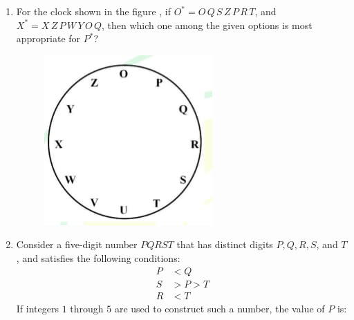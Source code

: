 \documentclass[journal,12pt,onecolumn]{article}
\theoremstyle{remark}
\begin{document}
\begin{enumerate}
    \item For the clock shown in the figure , if
    $O^* = O \, Q \, S \, Z \, P \, R \, T$, and
    $X^* = X \, Z \, P \, W \, Y \, O \, Q$,
    then which one among the given options is most appropriate for $P^*$?
    \begin{figure}[H]
        \centering
        \includegraphics[width=0.7\columnwidth]{figs/2q-7.jpg}
        \caption{}
        \label{fig:q7}
    \end{figure}

    \hfill{}
    \begin{enumerate}
    \end{enumerate}

    \item Consider a five-digit number $PQRST$ that has distinct digits $P, Q, R, S$, and $T$, and satisfies the following conditions:
    \begin{align*}
        P &< Q \\
        S &> P > T \\
        R &< T
    \end{align*}
    If integers $1$ through $5$ are used to construct such a number, the value of $P$ is:
    

\end{enumerate}
\end{document}
